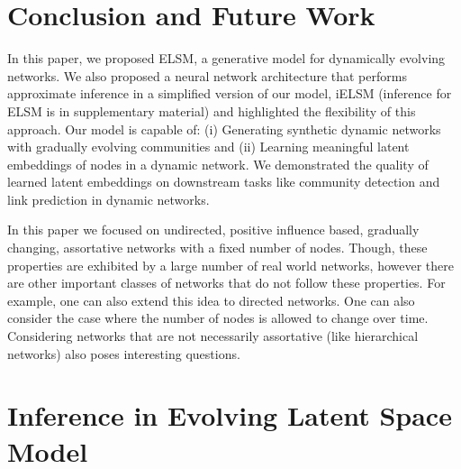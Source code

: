\documentclass[letterpaper]{article} %
\begin{document}

\section{Conclusion and Future Work}
\label{section:conclusionandfuturework}
In this paper, we proposed ELSM, a generative model for dynamically evolving networks. We also proposed a neural network architecture that performs approximate inference in a simplified version of our model, iELSM (inference for ELSM is in supplementary material) and highlighted the flexibility of this approach. Our model is capable of: (i) Generating synthetic dynamic networks with gradually evolving communities and (ii) Learning meaningful latent embeddings of nodes in a dynamic network. We demonstrated the quality of learned latent embeddings on downstream tasks like community detection and link prediction in dynamic networks.

In this paper we focused on undirected, positive influence based, gradually changing, assortative networks with a fixed number of nodes. Though, these properties are exhibited by a large number of real world networks, however there are other important classes of networks that do not follow these properties. For example, one can also extend this idea to directed networks. One can also consider the case where the number of nodes is allowed to change over time. Considering networks that are not necessarily assortative (like hierarchical networks) also poses interesting questions.






\newpage
\appendix
\section{Inference in Evolving Latent Space Model}
\label{appendix:inferenceinfullELSM}
\end{document}
